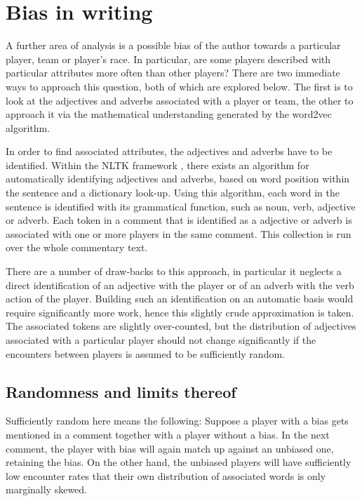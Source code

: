 \documentclass[10pt, a4paper]{UUThesisTemplate}
\begin{document}
\chapter{Bias in writing}\label{cha:bias}

A further area of analysis is a possible bias of the author towards a particular player, team or player's race. In particular, are some players described with particular attributes more often than other players? There are two immediate ways to approach this question, both of which are explored below. The first is to look at the adjectives and adverbs associated with a player or team, the other to approach it via the mathematical understanding generated by the word2vec algorithm.

In order to find associated attributes, the adjectives and adverbs have to be identified. Within the NLTK framework \cite{nltk}, there exists an algorithm for automatically identifying adjectives and adverbs, based on word position within the sentence and a dictionary look-up. Using this algorithm, each word in the sentence is identified with its grammatical function, such as noun, verb, adjective or adverb. Each token in a comment that is identified as a adjective or adverb is associated with one or more players in the same comment. This collection is run over the whole commentary text.

There are a number of draw-backs to this approach, in particular it neglects a direct identification of an adjective with the player or of an adverb with the verb action of the player. Building such an identification on an automatic basis would require significantly more work, hence this slightly crude approximation is taken. The associated tokens are slightly over-counted, but the distribution of adjectives associated with a particular player should not change significantly if the encounters between players is assumed to be sufficiently random.

\section{Randomness and limits thereof}

Sufficiently random here means the following: Suppose a player with a bias gets mentioned in a comment together with a player without a bias. In the next comment, the player with bias will again match up against an unbiased one, retaining the bias. On the other hand, the unbiased players will have sufficiently low encounter rates that their own distribution of associated words is only marginally skewed.
\end{document}
